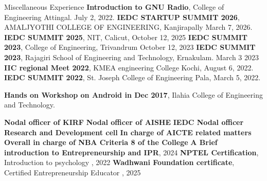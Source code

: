 \begin{rubric}{Miscellaneous Experience}
\entry*[2022] \textbf{Introduction to GNU Radio},  College of
Engineering Attingal. July 2, 2022.
\entry*[2026] \textbf{IEDC STARTUP SUMMIT 2026},  AMALJYOTHI COLLEGE OF ENGINEERING, Kanjirapally  March 7, 2026.
\entry*[2025] \textbf{IEDC SUMMIT 2025},  NIT, Calicut, October 12, 2025
\entry*[2023] \textbf{IEDC SUMMIT 2023},  College of Engineering, Trivandrum October 12, 2023
\entry*[2023] \textbf{IEDC SUMMIT 2023},  Rajagiri School of Engineering and Technology, Ernakulam. March 3 2023
\entry*[2022] \textbf{IIC regional Meet 2022},  KMEA engineering College Kochi, August 6, 2022.
\entry*[2022] \textbf{IEDC SUMMIT 2022},  St. Joseph College of Engineering Pala, March 5, 2022.


\entry*[2017] \textbf{Hands on Workshop on Android in Dec 2017},  Ilahia College of Engineering and Technology.

\entry*[2023] \textbf{Nodal officer of KIRF}
\entry*[2022] \textbf{Nodal officer of AISHE}
\entry*[2021] \textbf{IEDC Nodal officer}
\entry*[2020] \textbf{Research and
Development cell }
\entry*[2020] \textbf{In charge of AICTE
related matters }
\entry*[2020] \textbf{Overall in charge of
NBA Criteria 8 of the College }
\entry*[2024] \textbf{A Brief introduction to Entrepreneurship and IPR},  2024 
\entry*[2022] \textbf{NPTEL Certification}, Introduction to psychology , 2022 
\entry*[2025] \textbf{Wadhwani Foundation  certificate}, Certified Entrepreneurship Educator , 2025
\end{rubric}
